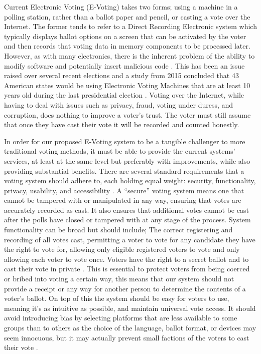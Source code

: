 \documentclass{article}
\begin{document}
Current Electronic Voting (E-Voting) takes two forms; using a machine in a polling station, rather than a ballot paper and pencil, or casting a vote over the Internet. The former tends to refer to a Direct Recording Electronic system which typically displays ballot options on a screen that can be activated by the voter and then records that voting data in memory components to be processed later. However, as with many electronics, there is the inherent problem of the ability to modify software and potentially insert malicious code \citep{44_wyndham_chen_das_2016}. This has been an issue raised over several recent elections and a study from 2015 concluded that 43 American states would be using Electronic Voting Machines that are at least 10 years old during the last presidential election \citep{45_holmes_2016}. Voting over the Internet, while having to deal with issues such as privacy, fraud, voting under duress, and corruption, does nothing to improve a voter's trust. The voter must still assume that once they have cast their vote it will be recorded and counted honestly.

In order for our proposed E-Voting system to be a tangible challenger to more traditional voting methods, it must be able to provide the current systems' services, at least at the same level but preferably with improvements, while also providing substantial benefits. There are several standard requirements that a voting system should adhere to, each holding equal weight: security, functionality, privacy, usability, and accessibility \citep{46_voting_system_standards_testing_and_certification_2016}. A ``secure'' voting system means one that cannot be tampered with or manipulated in any way, ensuring that votes are accurately recorded as cast. It also ensures that additional votes cannot be cast after the polls have closed or tampered with at any stage of the process. System functionality can be broad but should include; The correct registering and recording of all votes cast, permitting a voter to vote for any candidate they have the right to vote for, allowing only eligible registered voters to vote and only allowing each voter to vote once. Voters have the right to a secret ballot and to cast their vote in private \citep{46_voting_system_standards_testing_and_certification_2016}. This is essential to protect voters from being coerced or bribed into voting a certain way, this means that our system should not provide a receipt or any way for another person to determine the contents of a voter's ballot. On top of this the system should be easy for voters to use, meaning it's as intuitive as possible, and maintain universal vote access. It should avoid introducing bias by selecting platforms that are less available to some groups than to others as the choice of the language, ballot format, or devices may seem innocuous, but it may actually prevent small factions of the voters to cast their vote \citep{47_petride_2016}.
\end{document}
